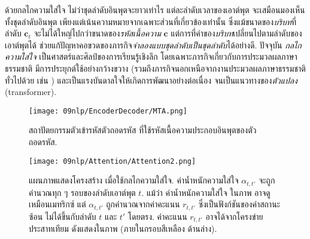 ด้วยกลไกความใส่ใจ
ไม่ว่าชุดลำดับอินพุตจะยาวเท่าไร
แต่ละลำดับเวลาของเอาต์พุต จะเสมือนมองเห็นทั้งชุดลำดับอินพุต เพียงแต่เน้นความหมายจากเฉพาะส่วนที่เกี่ยวข้องเท่านั้น
ซึ่งแม้ขนาดของ\textit{บริบท}ที่ลำดับ $\bm{c}_t$ 
จะไม่ได้ใหญ่ไปกว่าขนาดของ\textit{รหัสเนื้อความ} $\bm{c}$
แต่การที่ค่าของ\textit{บริบท}เปลี่ยนไปตามลำดับของเอาต์พุตได้
ช่วยแก้ปัญหาคอขวดของภารกิจ\textit{จำลองแบบชุดลำดับเป็นชุดลำดับ}ได้อย่างดี.
ปัจจุบัน
\textit{กลไกความใส่ใจ}
เป็นศาสตร์และศิลป์ของการเรียนรู้เชิงลึก โดยเฉพาะภารกิจเกี่ยวกับการประมวลผลภาษาธรรมชาติ
มีการประยุกต์ใช้อย่างกว้างขวาง (รวมถึงภารกิจนอกเหนือจากงานประมวลผลภาษาธรรมชาติทั่วไปด้วย เช่น \cite{XuEtAl2015})
และเป็นแรงบันดาลใจให้เกิดการพัฒนาอย่างต่อเนื่อง
จนเป็นแนวทางของ\textit{ตัวแปลง} (transformer\cite{VaswaniEtAl2017, clark2019what, brown2020language}).

\begin{figure}
	\begin{center}		
		\texttt{[image: 09nlp/EncoderDecoder/MTA.png]}	
		\caption[สถาปัตยกรรมตัวเข้ารหัสตัวถอดรหัส ที่ใช้รหัสเนื้อความประกอบอินพุตของตัวถอดรหัส]{สถาปัตยกรรมตัวเข้ารหัสตัวถอดรหัส ที่ใช้รหัสเนื้อความประกอบอินพุตของตัวถอดรหัส.
		}
		\label{fig: nlp encoder-decoder without attention}
	\end{center}
\end{figure}


\begin{figure}
	\begin{center}		
		\texttt{[image: 09nlp/Attention/Attention2.png]}	
		\caption[แผนภาพแสดงโครงสร้าง เมื่อใช้กลไกความใส่ใจ]{แผนภาพแสดงโครงสร้าง เมื่อใช้กลไกความใส่ใจ.	
		ค่าน้ำหนักความใส่ใจ $\alpha_{t,t'}$ จะถูกคำนวณทุก ๆ รอบของลำดับเอาต์พุต $t$.
		แม้ว่า ค่าน้ำหนักความใส่ใจ ในภาพ อาจดูเหมือนเมทริกซ์ 
		แต่ $\alpha_{t,t'}$ ถูกคำนวณจากค่าคะแนน $r_{t,t'}$ ซึ่งเป็นฟังก์ชันของค่าสถานะซ้อน ไม่ได้ขึ้นกับลำดับ $t$ และ $t'$ โดยตรง.
		ค่าคะแนน $r_{t,t'}$ อาจได้จากโครงข่ายประสาทเทียม ดังแสดงในภาพ (ภายในกรอบสีเหลือง ด้านล่าง).
		}
		\label{fig: nlp encoder-decoder with attention}
	\end{center}
\end{figure}


%
%


